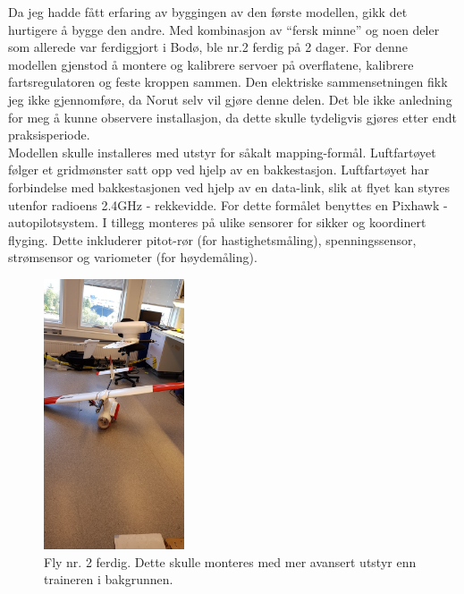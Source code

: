 \documentclass[12pt, a4paper]{article}
\begin{document}
Da jeg hadde fått erfaring av byggingen av den første modellen, gikk det hurtigere å bygge den andre. Med kombinasjon av ``fersk minne'' og noen deler som allerede var ferdiggjort i Bodø, ble nr.2 ferdig på 2 dager. For denne modellen gjenstod å montere og kalibrere servoer på overflatene, kalibrere fartsregulatoren og feste kroppen sammen. Den elektriske sammensetningen fikk jeg ikke gjennomføre, da Norut selv vil gjøre denne delen. Det ble ikke anledning for meg å kunne observere installasjon, da dette skulle tydeligvis gjøres etter endt praksisperiode. \\
Modellen skulle installeres med utstyr for såkalt mapping-formål. Luftfartøyet følger et gridmønster satt opp ved hjelp av en bakkestasjon. Luftfartøyet har forbindelse med bakkestasjonen ved hjelp av en data-link, slik at flyet kan styres utenfor radioens 2.4GHz - rekkevidde. For dette formålet benyttes en Pixhawk - autopilotsystem. I tillegg monteres på ulike sensorer for sikker og koordinert flyging. Dette inkluderer pitot-rør (for hastighetsmåling), spenningssensor, strømsensor og variometer (for høydemåling). 

\begin{figure}[h]
	\centering
	\includegraphics[width = .6\textwidth, height = 8cm]{bilder/andre_fly_ferdigstilt.jpg}
	\caption[Fly nummer to ferdig]{Fly nr. 2 ferdig. Dette skulle monteres med mer avansert utstyr enn traineren i bakgrunnen.}
\end{figure}
\end{document}
